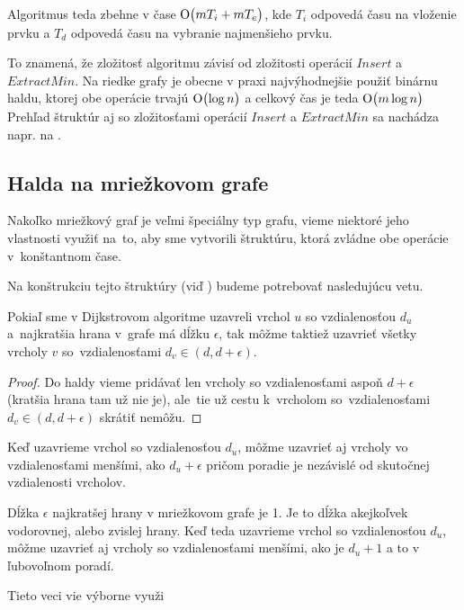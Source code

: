 Algoritmus teda zbehne v čase $\operatorname{O}\bigl(m T_i + m T_e\bigr)$, kde $T_i$ odpovedá času na vloženie prvku a $T_d$ odpovedá času na vybranie najmenšieho prvku.

To znamená, že zložitosť algoritmu závisí od zložitosti operácií $Insert$ a $ExtractMin$. Na riedke grafy je obecne v praxi najvýhodnejšie použiť 
binárnu haldu, ktorej obe operácie trvajú $\operatorname{O}\bigl(\log{n} \bigr) $ a celkový čas je teda $\operatorname{O}\bigl(m\log{n}\bigr)$
Prehľad štruktúr aj so zložitosťami operácií $Insert$ a $ExtractMin$ sa nachádza napr. na \cite{mares07}.

\subsection{Halda na mriežkovom grafe}
Nakoľko mriežkový graf je veľmi špeciálny typ grafu,
vieme niektoré jeho vlastnosti využiť na~to, aby sme vytvorili štruktúru, ktorá zvládne obe operácie v~konštantnom čase. 


Na konštrukciu tejto štruktúry (viď \cite{gs97}) budeme potrebovať nasledujúcu vetu.

\begin{theorem}
Pokiaľ sme v Dijkstrovom algoritme uzavreli vrchol $u$ so vzdialenosťou $d_u$ a~najkratšia hrana v~grafe má dĺžku $\epsilon$, tak môžme taktiež 
uzavrieť všetky vrcholy $v$ so~vzdialenosťami $d_v \in (d, d + \epsilon)$.
\end{theorem}
\begin{proof}
Do haldy vieme pridávať len vrcholy so vzdialenosťami aspoň $d + \epsilon$ (kratšia hrana tam už nie je), 
ale~tie už cestu k~vrcholom so~vzdialenosťami
$d_v \in (d, d + \epsilon)$ skrátiť nemôžu.
\end{proof}


\begin{consequence}
Keď uzavrieme vrchol so vzdialenosťou $d_u$, môžme uzavrieť aj vrcholy vo vzdialenosťami menšími, ako $d_u + \epsilon$
pričom poradie je nezávislé od skutočnej vzdialenosti vrcholov.
\end{consequence}

\begin{example}
Dĺžka $\epsilon$ najkratšej hrany v mriežkovom grafe je 1. Je to dĺžka akejkoľvek vodorovnej, alebo zvislej hrany.
Keď teda uzavrieme vrchol so vzdialenosťou $d_u$, môžme uzavrieť aj vrcholy so vzdialenosťami menšími, ako je $d_u + 1$ a to v ľubovoľnom poradí.
\end{example}

Tieto veci vie výborne využi

